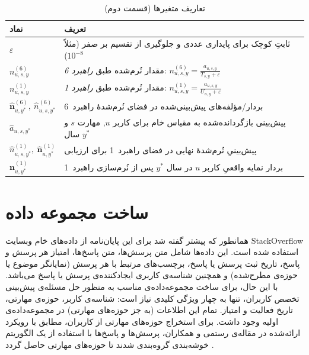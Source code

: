  \begin{table}[H]
   \centering
   \caption{تعاریف متغیرها (قسمت دوم)}
   \label{tab:definitions-part2}
   \begin{tabularx}{\textwidth}{|>{\centering\arraybackslash}m{3.2cm}|>{\centering\arraybackslash}X|}
     \hline
     \textbf{نماد} & \textbf{تعریف} \\
     \hline
     $\varepsilon$ & ثابتِ کوچک برای پایداری عددی و جلوگیری از تقسیم بر صفر (مثلاً $10^{-8}$) \\
     \hline
     $n^{(6)}_{u,s,y}$ & مقدار نُرم‌شده طبق \emph{راهبرد 6}: $\displaystyle n^{(6)}_{u,s,y}=\frac{a_{u,s,y}}{T_{s,y}+\varepsilon}$ \\
     \hline
     $n^{(1)}_{u,s,y}$ & مقدار نُرم‌شده طبق \emph{راهبرد 1}: $\displaystyle n^{(1)}_{u,s,y}=\frac{a_{u,s,y}}{U_{u,y}+\varepsilon}$ \\
     \hline
     $\widehat{\mathbf{n}}^{(6)}_{u,y^*},\ \widehat{n}^{(6)}_{u,s,y^*}$ & بردار/مؤلفه‌های پیش‌بینی‌شده در فضای نُرم‌شدهٔ راهبرد~6 \\
     \hline
     $\widehat{a}_{u,s,y^*}$ & پیش‌بینی بازگردانده‌شده به مقیاس خام برای کاربر $u$, مهارت $s$ و سال $y^*$ \\
     \hline
     $\widehat{n}^{(1)}_{u,s,y^*},\ \widehat{\mathbf{n}}^{(1)}_{u,y^*}$ & پیش‌بینیِ نُرم‌شدهٔ نهایی در فضای راهبرد~1 برای ارزیابی \\
     \hline
     $\mathbf{n}^{(1)}_{u,y^*}$ & بردار نمایه واقعیِ کاربر $u$ در سال $y^*$ پس از نُرم‌سازی راهبرد~1 \\
     \hline
   \end{tabularx}
 \end{table}
 
 



\section{ساخت مجموعه داده}
همانطور که پیشتر گفته شد برای این پایان‌نامه از داده‌های خام وبسایت   StackOverflow استفاده شده است. این داده‌ها شامل متن پرسش‌ها، متن پاسخ‌ها، امتیاز هر پرسش و پاسخ، تاریخ ثبت پرسش یا پاسخ، برچسب‌های مرتبط با هر پرسش (نمایانگر موضوع یا حوزه‌ی مطرح‌شده) و همچنین شناسه‌ی کاربری ایجادکننده‌ی پرسش یا پاسخ می‌باشد.
با این حال، برای ساخت مجموعه‌داده‌ی مناسب به منظور حل مسئله‌ی پیش‌بینی تخصص کاربران، تنها به چهار ویژگی کلیدی نیاز است: شناسه‌ی کاربر، حوزه‌ی مهارتی، تاریخ فعالیت و امتیاز. تمام این اطلاعات (به جز حوزه‌های مهارتی) در مجموعه‌داده‌ی اولیه وجود داشت. برای استخراج حوزه‌های مهارتی از کاربران، مطابق با رویکرد ارائه‌شده در مقاله‌ی رستمی و همکاران، پرسش‌ها و پاسخ‌ها با استفاده از یک الگوریتم خوشه‌بندی گروه‌بندی شدند تا حوزه‌های مهارتی حاصل گردد \cite{rostami_intern_2021}.

